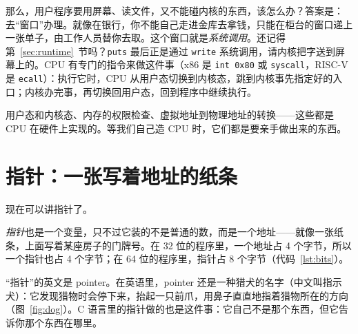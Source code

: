 那么，用户程序要用屏幕、读文件，又不能碰内核的东西，该怎么办？答案是：去“窗口”办理。就像在银行，你不能自己走进金库去拿钱，只能在柜台的窗口递上一张单子，由工作人员替你去取。这个窗口就是\emph{系统调用}。还记得第~\ref{sec:runtime}~节吗？\texttt{puts} 最后正是通过 \texttt{write} 系统调用，请内核把字送到屏幕上的。CPU 有专门的指令来做这件事（x86 是 \texttt{int 0x80} 或 \texttt{syscall}，RISC-V 是 \texttt{ecall}）：执行它时，CPU 从用户态切换到内核态，跳到内核事先指定好的入口；内核办完事，再切换回用户态，回到程序中继续执行。

用户态和内核态、内存的权限检查、虚拟地址到物理地址的转换——这些都是 CPU 在硬件上实现的。等我们自己造 CPU 时，它们都是要亲手做出来的东西。

\section{指针：一张写着地址的纸条}
\label{sec:pointer}

现在可以讲指针了。

\emph{指针}也是一个变量，只不过它装的不是普通的数，而是一个地址——就像一张纸条，上面写着某座房子的门牌号。在 32 位的程序里，一个地址占 4 个字节，所以一个指针也占 4 个字节；在 64 位的程序里，指针占 8 个字节（代码~\ref{lst:bits}）。

“指针”的英文是 pointer。在英语里，pointer 还是一种猎犬的名字（中文叫指示犬）：它发现猎物时会停下来，抬起一只前爪，用鼻子直直地指着猎物所在的方向（图~\ref{fig:dog}）。C 语言里的指针做的也是这件事：它自己不是那个东西，但它告诉你那个东西在哪里。

